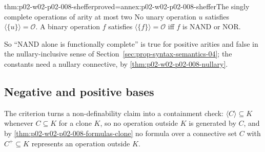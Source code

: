 \begin{hbcorollary}{thm:p02-w02-p02-008-sheffer}{proved=annex:p02-w02-p02-008-sheffer}{The singly complete operations of arity at most two}
No unary operation \(u\) satisfies \(\langle\{u\}\rangle=\mathcal O\).  A
binary operation \(f\) satisfies \(\langle\{f\}\rangle=\mathcal O\) iff
\(f\) is \(\mathrm{NAND}\) or \(\mathrm{NOR}\).
\end{hbcorollary}

So ``NAND alone is functionally complete'' is true for positive arities and
false in the nullary-inclusive sense of
Section~\ref{sec:prop-syntax-semantics-04}; the constants need a nullary
connective, by \cref{thm:p02-w02-p02-008-nullary}.

\subsection{Negative and positive bases}
\label{sec:p02-w02-p02-008-bases}

The criterion turns a non-definability claim into a containment check:
\(\langle C\rangle\subseteq K\) whenever \(C\subseteq K\) for a clone
\(K\), so no operation outside \(K\) is generated by \(C\), and by
\cref{thm:p02-w02-p02-008-formulas-clone} no formula over a connective set
\(C\) with \(C^+\subseteq K\) represents an operation outside \(K\).

